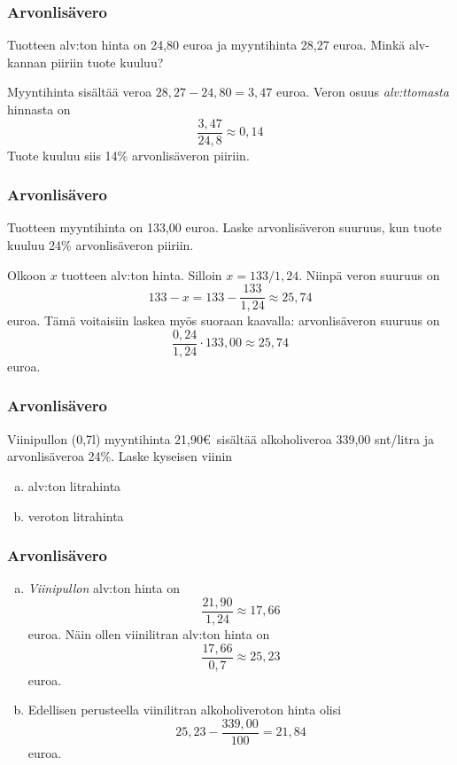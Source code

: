 \documentclass{beamer}
\begin{document}
\begin{frame}
\frametitle{Arvonlisävero}
	\begin{esim}
		Tuotteen alv:ton hinta on 24,80 euroa ja myyntihinta 28,27 euroa. Minkä alv-kannan piiriin tuote kuuluu?
	\end{esim}
	\pause
	\begin{ratkaisu}
		Myyntihinta sisältää veroa  \(28,27-24,80 = 3,47\) euroa.\pause
		Veron osuus \emph{alv:ttomasta} hinnasta on 
		\[
			\frac{3,47}{24,8} \approx 0,14
		\]
		\pause
		Tuote kuuluu siis 14\% arvonlisäveron piiriin.
	\end{ratkaisu}
\end{frame}

\begin{frame}
\frametitle{Arvonlisävero}
	\begin{esim}
		Tuotteen myyntihinta on 133,00 euroa. Laske arvonlisäveron suuruus, kun tuote kuuluu 24\% arvonlisäveron piiriin.
	\end{esim}
	\pause
	\begin{ratkaisu}
		Olkoon \(x\) tuotteen alv:ton hinta. \pause Silloin \(x= 133/1,24\). \pause Niinpä veron suuruus on \pause
		\[
			133- x = 133 - \frac{133}{1,24}\approx 25,74
		\]
		euroa. \pause Tämä voitaisiin laskea myös suoraan kaavalla: arvonlisäveron suuruus on \pause
			\[
				\frac{0,24}{1,24}\cdot133,00\approx 25,74
			\]
		euroa.
	\end{ratkaisu}
\end{frame}

\begin{frame}
\frametitle{Arvonlisävero}
	\begin{esim}
		Viinipullon (0,7l) myyntihinta 21,90\euro\ sisältää alkoholiveroa 339,00 snt/litra ja arvonlisäveroa 24\%. Laske kyseisen viinin
		\begin{enumerate}[(a)]
			\item alv:ton litrahinta
			\item veroton litrahinta
		\end{enumerate}
	\end{esim}
\end{frame}


\begin{frame}
\frametitle{Arvonlisävero}

	\begin{ratkaisu}
		\pause
		\begin{enumerate}[(a)]
			\item \emph{Viinipullon} alv:ton hinta on\pause 
				\[
					\frac{21,90}{1,24}\approx 17,66
				\]
				euroa. \pause Näin ollen viinilitran alv:ton hinta on 
				\[
					\frac{17,66}{0,7}\approx 25,23
				\] euroa.\pause
			\item Edellisen perusteella viinilitran alkoholiveroton hinta olisi \pause
				\[
					25,23-\frac{339,00}{100} = 21,84
				\]
				euroa.
		\end{enumerate}
	\end{ratkaisu}
\end{frame}
\end{document}
